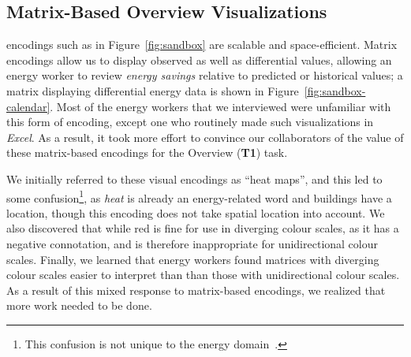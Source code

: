 \documentclass[journal]{vgtc}                %
\newcommand{\bqstart}[1]{\vspace{1mm} \noindent{\textbf{#1}}}
\begin{document}
\subsection{Matrix-Based Overview Visualizations}
\label{design-matrix}




\bqstart{Time series matrix} encodings such as in Figure~\ref{fig:sandbox} are scalable and space-efficient.
Matrix encodings allow us to display observed as well as differential values, allowing an energy worker to review {\it energy savings} relative to predicted or historical values; a matrix displaying differential energy data is shown in Figure~\ref{fig:sandbox-calendar}.
Most of the energy workers that we interviewed were unfamiliar with this form of encoding, except one who routinely made such visualizations in {\it Excel}. 
As a result, it took more effort to convince our collaborators of the value of these matrix-based encodings for the Overview ({\bf T1}) task.

We initially referred to these visual encodings as ``heat maps'', and this led to some confusion\footnote{This confusion is not unique to the energy domain~\cite{Field2015,Wilkinson2009}.}, as {\it heat} is already an energy-related word and buildings have a location, though this encoding does not take spatial location into account.
We also discovered that while red is fine for use in diverging colour scales, as it has a negative connotation, and is therefore inappropriate for unidirectional colour scales. 
Finally, we learned that energy workers found matrices with diverging colour scales easier to interpret than than those with unidirectional colour scales.
As a result of this mixed response to matrix-based encodings, we realized that more work needed to be done.
\end{document}
